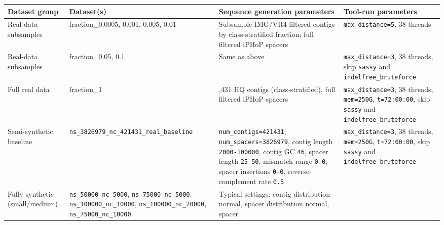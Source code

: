 \documentclass[
]{article}
\begin{document}
\begin{longtable}[]{@{}
  >{\raggedright\arraybackslash}p{}
  >{\raggedright\arraybackslash}p{}
  >{\raggedright\arraybackslash}p{}
  >{\raggedright\arraybackslash}p{}@{}}
\toprule\noalign{}
\begin{minipage}[b]{\linewidth}\raggedright
Dataset group
\end{minipage} & \begin{minipage}[b]{\linewidth}\raggedright
Dataset(s)
\end{minipage} & \begin{minipage}[b]{\linewidth}\raggedright
Sequence generation parameters
\end{minipage} & \begin{minipage}[b]{\linewidth}\raggedright
Tool-run parameters
\end{minipage} \\
\midrule\noalign{}
\endhead
\bottomrule\noalign{}
\endlastfoot
Real-data subsamples & fraction\_0.0005, 0.001, 0.005, 0.01 & Subsample
IMG/VR4 filtered contigs by class-stratified fraction; full filtered
iPHoP spacers & \texttt{max\_distance=5}, 38 threads \\
Real-data subsamples & fraction\_0.05, 0.1 & Same as above &
\texttt{max\_distance=3}, 38 threads, skip \texttt{sassy} and
\texttt{indelfree\_bruteforce} \\
Full real data & fraction\_1 & 421,431 HQ contigs (class-stratified),
full filtered iPHoP spacers & \texttt{max\_distance=3}, 38 threads,
\texttt{mem=250G}, \texttt{t=72:00:00}, skip \texttt{sassy} and
\texttt{indelfree\_bruteforce} \\
Semi-synthetic baseline &
\texttt{ns\_3826979\_nc\_421431\_real\_baseline} &
\texttt{num\_contigs=421431}, \texttt{num\_spacers=3826979}, contig
length \texttt{2000-100000}, contig GC \texttt{46}, spacer length
\texttt{25-50}, mismatch range \texttt{0-0}, spacer insertions
\texttt{0-0}, reverse-complement rate \texttt{0.5} &
\texttt{max\_distance=3}, 38 threads, \texttt{mem=250G},
\texttt{t=72:00:00}, skip \texttt{sassy} and
\texttt{indelfree\_bruteforce} \\
Fully synthetic (small/medium) & \texttt{ns\_50000\_nc\_5000},
\texttt{ns\_75000\_nc\_5000}, \texttt{ns\_100000\_nc\_10000},
\texttt{ns\_100000\_nc\_20000}, \texttt{ns\_75000\_nc\_10000} & Typical
settings: contig distribution normal, spacer distribution normal, spacer

\end{longtable}
\end{document}
